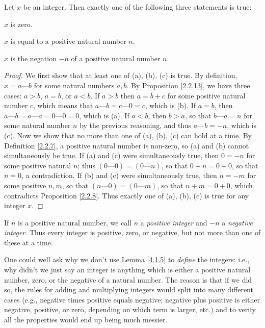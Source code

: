 \begin{lemma}\label{4.1.5}
    Let \(x\) be an integer.
    Then exactly one of the following three statements is true:
    \begin{enumerate*}
        \item \(x\) is zero.
        \item \(x\) is equal to a positive natural number \(n\).
        \item \(x\) is the negation \(-n\) of a positive natural number \(n\).
    \end{enumerate*}
\end{lemma}

\begin{proof}
    We first show that at least one of (a), (b), (c) is true.
    By definition, \(x = a \text{---} b\) for some natural numbers \(a, b\).
    By Proposition \ref{2.2.13}, we have three cases: \(a > b\), \(a = b\), or \(a < b\).
    If \(a > b\) then \(a = b + c\) for some positive natural number \(c\), which means that \(a \text{---} b = c \text{---} 0 = c\), which is (b).
    If \(a = b\), then \(a \text{---} b = a \text{---} a = 0 \text{---} 0 = 0\), which is (a).
    If \(a < b\), then \(b > a\), so that \(b \text{---} a = n\) for some natural number \(n\) by the previous reasoning, and thus \(a \text{---} b = -n\), which is (c).
    Now we show that no more than one of (a), (b), (c) can hold at a time.
    By Definition \ref{2.2.7}, a positive natural number is non-zero, so (a) and (b) cannot simultaneously be true.
    If (a) and (c) were simultaneously true, then \(0 = -n\) for some positive natural \(n\);
    thus \((0 \text{---} 0) = (0 \text{---} n)\), so that \(0 + n = 0 + 0\), so that \(n = 0\), a contradiction.
    If (b) and (c) were simultaneously true, then \(n = -m\) for some positive \(n, m\), so that \((n \text{---} 0) = (0 \text{---} m)\), so that \(n + m = 0 + 0\), which contradicts Proposition \ref{2.2.8}.
    Thus exactly one of (a), (b), (c) is true for any integer \(x\).
\end{proof}

\begin{note}
    If \(n\) is a positive natural number, we call \(n\) a \emph{positive integer} and \(-n\) a \emph{negative integer}.
    Thus every integer is positive, zero, or negative, but not more than one of these at a time.
\end{note}

\begin{note}
    One could well ask why we don’t use Lemma \ref{4.1.5} to \emph{define} the integers;
    i.e., why didn’t we just say an integer is anything which is either a positive natural number, zero, or the negative of a natural number.
    The reason is that if we did so, the rules for adding and multiplying integers would split into many different cases (e.g., negative times positive equals negative; negative plus positive is either negative, positive, or zero, depending on which term is larger, etc.) and to verify all the properties would end up being much messier.
\end{note}

